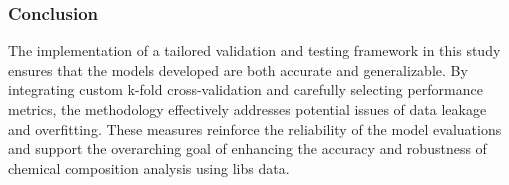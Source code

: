 \subsubsection{Conclusion}
The implementation of a tailored validation and testing framework in this study ensures that the models developed are both accurate and generalizable.
By integrating custom k-fold cross-validation and carefully selecting performance metrics, the methodology effectively addresses potential issues of data leakage and overfitting.
These measures reinforce the reliability of the model evaluations and support the overarching goal of enhancing the accuracy and robustness of chemical composition analysis using \gls{libs} data.


